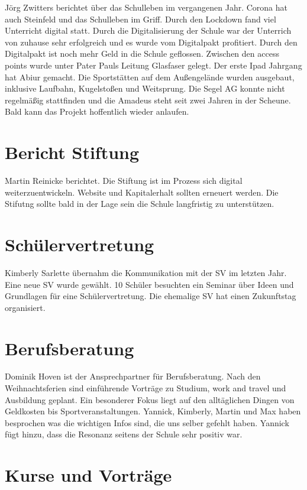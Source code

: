 \documentclass[a4paper, 11pt]{article}
\begin{document}
Jörg Zwitters berichtet über das Schulleben im vergangenen Jahr.
Corona hat auch Steinfeld und das Schulleben im Griff.
Durch den Lockdown fand viel Unterricht digital statt.
Durch die Digitalisierung der Schule war der Unterrich von zuhause sehr erfolgreich und es wurde vom Digitalpakt profitiert.
Durch den Digitalpakt ist noch mehr Geld in die Schule geflossen. Zwischen den access points wurde unter Pater Pauls Leitung Glasfaser gelegt.
Der erste Ipad Jahrgang hat Abiur gemacht.
Die Sportstätten auf dem Außengelände wurden ausgebaut, inklusive Laufbahn, Kugelstoßen und Weitsprung.
Die Segel AG konnte nicht regelmäßig stattfinden und die Amadeus steht seit zwei Jahren in der Scheune.
Bald kann das Projekt hoffentlich wieder anlaufen.

\section*{Bericht Stiftung}

Martin Reinicke berichtet.
Die Stiftung ist im Prozess sich digital weiterzuentwickeln. Website und Kapitalerhalt sollten erneuert werden.
Die Stifutng sollte bald in der Lage sein die Schule langfristig zu unterstützen.

\section*{Schülervertretung}

Kimberly Sarlette übernahm die Kommunikation mit der SV im letzten Jahr.
Eine neue SV wurde gewählt. 10 Schüler besuchten ein Seminar über Ideen und Grundlagen für eine Schülervertretung.
Die ehemalige SV hat einen Zukunftstag organisiert.

\section*{Berufsberatung}

Dominik Hoven ist der Ansprechpartner für Berufsberatung.
Nach den Weihnachtsferien sind einführende Vorträge zu Studium, work and travel und Ausbildung geplant.
Ein besonderer Fokus liegt auf den alltäglichen Dingen von Geldkosten bis Sportveranstaltungen.
Yannick, Kimberly, Martin und Max haben besprochen was die wichtigen Infos sind, die uns selber gefehlt haben.
Yannick fügt hinzu, dass die Resonanz seitens der Schule sehr positiv war.

\section*{Kurse und Vorträge}
\end{document}
